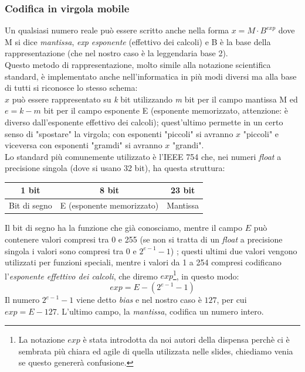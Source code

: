 \documentclass[class=book, crop=false]{standalone}
\begin{document}
\subsubsection{Codifica in virgola mobile}
Un qualsiasi numero reale può essere scritto anche nella forma $x=M\cdot B^{exp}$ dove M si dice \emph{mantissa}, \emph{exp} \emph{esponente} (effettivo dei calcoli) e B è la base della rappresentazione (che nel nostro caso è la leggendaria base 2).\\
Questo metodo di rappresentazione, molto simile alla notazione scientifica standard, è implementato anche nell'informatica in più modi diversi ma alla base di tutti si riconosce lo stesso schema: \\
$x$ può essere rappresentato su \emph{k} bit utilizzando \emph{m} bit per il campo mantissa M ed $e=k-m$ bit per il campo esponente E (esponente memorizzato, attenzione: è diverso dall'esponente effettivo dei calcoli); quest'ultimo permette in un certo senso di "spostare" la virgola; con esponenti "piccoli" si avranno $x$ "piccoli" e viceversa con esponenti "gramdi" si avranno $x$ "grandi".\\
Lo standard più comunemente utilizzato è l'IEEE 754 che, nei numeri \emph{float} a precisione singola (dove si usano 32 bit), ha questa struttura:
\begin{table}[h!]
	\centering
	\begin{tabular}{|l|l|l|}
		\hline
		\multicolumn{1}{|c|}{1 bit} & \multicolumn{1}{c|}{8 bit} & \multicolumn{1}{c|}{23 bit} \\ \hline
		Bit di segno                & E (esponente memorizzato)    & Mantissa                    \\ \hline
	\end{tabular}
\end{table}


Il bit di segno ha la funzione che già conosciamo, mentre il campo $E$ può contenere valori compresi tra 0 e 255 (se non si tratta di un \emph{float} a precisione singola i valori sono compresi tra 0 e \(2^{e-1}-1\))%
; questi ultimi due valori vengono utilizzati per funzioni speciali, mentre i valori da 1 a 254 compresi codificano l'\emph{esponente effettivo dei calcoli}, che diremo $exp$\footnote{La notazione $exp$ è stata introdotta da noi autori della dispensa perchè ci è sembrata più chiara ed agile di quella utilizzata nelle slides, chiediamo venia se questo genererà confusione.}, in questo modo:
\begin{equation*}
exp=E-(2^{e-1}-1)
\end{equation*}
Il numero $2^{e-1}-1$ viene detto \emph{bias} e nel nostro caso è \(127\), per cui $exp=E-127$. L'ultimo campo, la \emph{mantissa}, codifica un numero intero.
\end{document}
